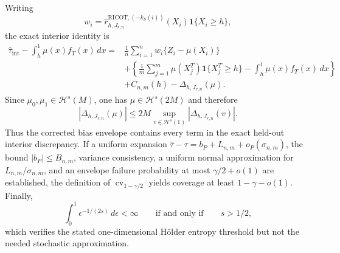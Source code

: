 Writing
\[
w_i=\widehat r^{\mathrm{RICOT},(-k_S(i))}_{h,J_{r,n}}(X_i)\mathbf 1\{X_i\ge h\},
\]
the exact interior identity is
\[
\begin{aligned}
\widehat\tau_{\mathrm{int}}-\int_h^1\mu(x)f_T(x)\,dx
={}&\frac1n\sum_{i=1}^nw_i\{Z_i-\mu(X_i)\}\\
&+\left\{\frac1m\sum_{j=1}^m\mu(X_j^T)\mathbf 1\{X_j^T\ge h\}-\int_h^1\mu(x)f_T(x)\,dx\right\}\\
&+C_{n,m}(h)-\Delta_{h,J_{r,n}}(\mu).
\end{aligned}
\]
Since \(\mu_0,\mu_1\in\mathcal H^s(M)\), one has \(\mu\in\mathcal H^s(2M)\) and therefore
\[
|\Delta_{h,J_{r,n}}(\mu)|\le2M\sup_{v\in\mathcal H^s(1)}|\Delta_{h,J_{r,n}}(v)|.
\]
Thus the corrected bias envelope contains every term in the exact held-out interior discrepancy. If a uniform expansion \(\widehat\tau-\tau=b_P+L_{n,m}+o_P(\sigma_{n,m})\), the bound \(|b_P|\le B_{n,m}\), variance consistency, a uniform normal approximation for \(L_{n,m}/\sigma_{n,m}\), and an envelope failure probability at most \(\gamma/2+o(1)\) are established, the definition of \(\operatorname{cv}_{1-\gamma/2}\) yields coverage at least \(1-\gamma-o(1)\). Finally,
\[
\int_0^1\epsilon^{-1/(2s)}\,d\epsilon<\infty
\qquad\text{if and only if}\qquad s>1/2,
\]
which verifies the stated one-dimensional Hölder entropy threshold but not the needed stochastic approximation.